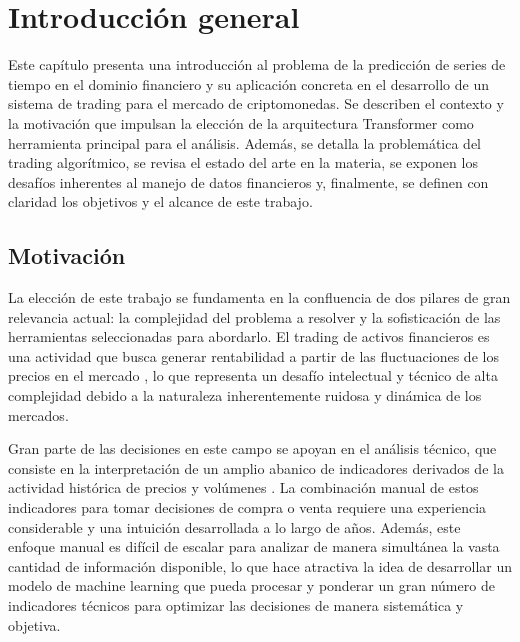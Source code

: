 
\chapter{Introducción general}
\label{Chapter1}

Este capítulo presenta una introducción al problema de la predicción de series de tiempo en el dominio financiero y su aplicación concreta en el desarrollo de un sistema de trading para el mercado de criptomonedas. Se describen el contexto y la motivación que impulsan la elección de la arquitectura Transformer como herramienta principal para el análisis. Además, se detalla la problemática del trading algorítmico, se revisa el estado del arte en la materia, se exponen los desafíos inherentes al manejo de datos financieros y, finalmente, se definen con claridad los objetivos y el alcance de este trabajo.

\section{Motivación}

La elección de este trabajo se fundamenta en la confluencia de dos pilares de gran relevancia actual: la complejidad del problema a resolver y la sofisticación de las herramientas seleccionadas para abordarlo. El trading de activos financieros es una actividad que busca generar rentabilidad a partir de las fluctuaciones de los precios en el mercado \cite{Chen:2023}, lo que representa un desafío intelectual y técnico de alta complejidad debido a la naturaleza inherentemente ruidosa y dinámica de los mercados.

Gran parte de las decisiones en este campo se apoyan en el análisis técnico, que consiste en la interpretación de un amplio abanico de indicadores derivados de la actividad histórica de precios y volúmenes \cite{Kirkpatrick:2006}. La combinación manual de estos indicadores para tomar decisiones de compra o venta requiere una experiencia considerable y una intuición desarrollada a lo largo de años. Además, este enfoque manual es difícil de escalar para analizar de manera simultánea la vasta cantidad de información disponible, lo que hace atractiva la idea de desarrollar un modelo de machine learning que pueda procesar y ponderar un gran número de indicadores técnicos para optimizar las decisiones de manera sistemática y objetiva.

